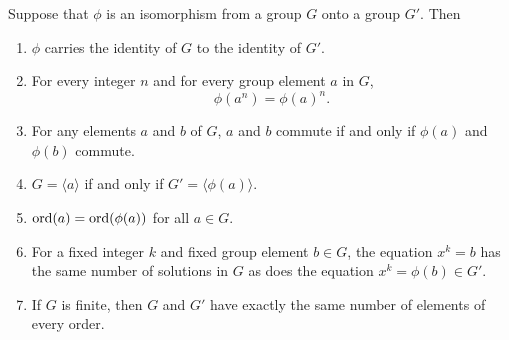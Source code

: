 \begin{theorem}
    Suppose that $\phi$ is an isomorphism from a group $G$ onto a group $G'$. Then 
    \begin{enumerate}
        \item $\phi$ carries the identity of $G$ to the identity of $G'$.
        \item For every integer $n$ and for every group element $a$ in $G$,
        \[
            \phi(a^n) = \phi(a)^n.
        \]
        \item For any elements $a$ and $b$ of $G$, $a$ and $b$ commute if and only if $\phi(a)$ and $\phi(b)$ commute.
        \item $G = \langle a \rangle$ if and only if $G' = \langle \phi(a) \rangle$.
        \item $\operatorname{ord}(a) = \operatorname{ord}(\phi(a))$ for all $a \in G$.
        \item For a fixed integer $k$ and fixed group element $b \in G$, the equation $x^k = b$ has the same number of solutions 
        in $G$ as does the equation $x^k = \phi(b) \in G'$.
        \item If $G$ is finite, then $G$ and $G'$ have exactly the same number of elements of every order.
    \end{enumerate}
\end{theorem}
